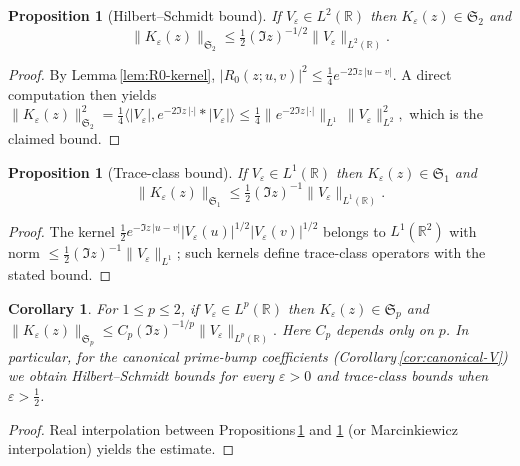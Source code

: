 ﻿\documentclass[12pt,a4paper]{article}
\newtheorem{proposition}[theorem]{Proposition}
\newtheorem{corollary}[theorem]{Corollary}
\theoremstyle{definition}
\theoremstyle{remark}
\newcommand{\RR}{\mathbb{R}}
\begin{document}
\begin{proposition}[Hilbert--Schmidt bound]\label{prop:BS-HS}
If $V_\varepsilon\in L^2(\RR)$ then $K_\varepsilon(z)\in\mathfrak{S}_2$ and
\begin{equation}
  \|K_\varepsilon(z)\|_{\mathfrak S_2} \le \tfrac{1}{2} (\Im z)^{-1/2} \|V_\varepsilon\|_{L^2(\RR)}.
\end{equation}
\end{proposition}

\begin{proof}
By Lemma\,\ref{lem:R0-kernel}, $|R_0(z;u,v)|^2 \le \tfrac{1}{4} e^{-2\Im z\,|u-v|}$.  A direct computation then yields
\(
  \|K_\varepsilon(z)\|_{\mathfrak S_2}^2
   = \tfrac{1}{4} \langle |V_\varepsilon|, e^{-2\Im z\,|\cdot|} * |V_\varepsilon|\rangle
   \le \tfrac{1}{4} \|e^{-2\Im z\,|\cdot|}\|_{L^1}\,\|V_\varepsilon\|_{L^2}^2,
\)
which is the claimed bound.
\end{proof}

\begin{proposition}[Trace-class bound]\label{prop:BS-trace}
If $V_\varepsilon\in L^1(\RR)$ then $K_\varepsilon(z)\in\mathfrak{S}_1$ and
\begin{equation}
  \|K_\varepsilon(z)\|_{\mathfrak S_1} \le \tfrac{1}{2} (\Im z)^{-1} \|V_\varepsilon\|_{L^1(\RR)}.
\end{equation}
\end{proposition}

\begin{proof}
The kernel $\tfrac{1}{2} e^{-\Im z\,|u-v|} |V_\varepsilon(u)|^{1/2}|V_\varepsilon(v)|^{1/2}$ belongs to $L^1(\RR^2)$ with norm $\le \tfrac{1}{2}(\Im z)^{-1}\|V_\varepsilon\|_{L^1}$; such kernels define trace-class operators with the stated bound.
\end{proof}

\begin{corollary}\label{cor:BS-Sp}
For $1\le p\le 2$, if $V_\varepsilon\in L^p(\RR)$ then $K_\varepsilon(z)\in \mathfrak{S}_p$ and
\(
  \|K_\varepsilon(z)\|_{\mathfrak S_p} \le C_p (\Im z)^{-1/p} \|V_\varepsilon\|_{L^p(\RR)}.
\)
Here $C_p$ depends only on $p$.  In particular, for the canonical prime-bump coefficients (Corollary\,\ref{cor:canonical-V}) we obtain Hilbert--Schmidt bounds for every $\varepsilon>0$ and trace-class bounds when $\varepsilon>\tfrac12$.
\end{corollary}

\begin{proof}
Real interpolation between Propositions\,\ref{prop:BS-HS} and \ref{prop:BS-trace} (or Marcinkiewicz interpolation) yields the estimate.
\end{proof}
\end{document}
